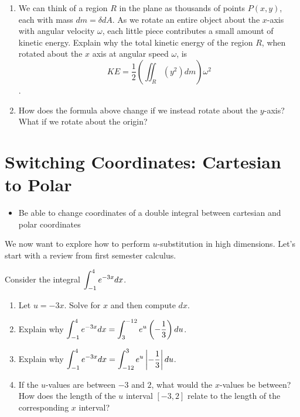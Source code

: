 {\begin{problem}
\begin{enumerate}
  \item We can think of a region $R$ in the plane as thousands of points $P(x,y)$, each with mass $dm=\delta dA$. As we rotate an entire object about the $x$-axis with angular velocity $\omega$, each little piece contributes a small amount of kinetic energy. Explain why the total kinetic energy of the region $R$, when rotated about the $x$ axis at angular speed $\omega$, is
$$KE= \frac{1}{2}\left(\iint_R (y^2)dm\right)\omega^2$$.  
  \item How does the formula above change if we instead rotate about the $y$-axis? What if we rotate about the origin?
 \end{enumerate}
\end{problem}

} %



\uday
\normalsize
\section{Switching Coordinates: Cartesian to Polar}
\begin{itemize}
\item Be able to change coordinates of a double integral between cartesian and polar coordinates
\end{itemize}

\vskip0.2cm

We now want to explore how to perform $u$-substitution in high dimensions. Let's start with a review from first semester calculus.

\begin{problem}
Consider the integral $\displaystyle\int_{-1}^4 e^{-3x} dx$.  
\begin{enumerate}
 \item Let $u=-3x$.  Solve for $x$ and then compute $dx$.
 \item Explain why $\displaystyle\int_{-1}^4 e^{-3x} dx=\int_{3}^{-12}e^u \left(-\frac{1}{3}\right)du$.  
 \item Explain why $\displaystyle\int_{-1}^4 e^{-3x} dx=\int_{-12}^{3}e^u \left|-\frac{1}{3}\right| du$.
 \item If the $u$-values are between $-3$ and $2$, what would the $x$-values be between? How does the  length of the $u$ interval $[-3,2]$ relate to the length of the corresponding $x$ interval?
\end{enumerate}
\end{problem}

